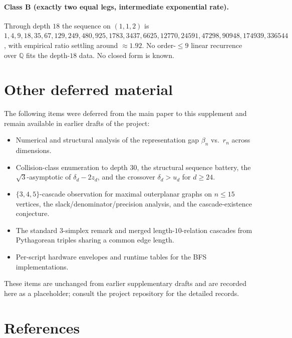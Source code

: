 \documentclass[11pt,a4paper]{article}
\theoremstyle{remark}
\theoremstyle{plain}
\begin{document}
\paragraph{Class B (exactly two equal legs, intermediate exponential rate).}
Through depth $18$ the sequence on $(1, 1, 2)$ is
$1, 4, 9, 18, 35, 67, 129, 249, 480, 925, 1783, 3437, 6625, 12770,
24591, 47298, 90948, 174939, 336544$, with empirical ratio settling
around $\approx 1.92$.  No order-$\le 9$ linear recurrence over
$\mathbb{Q}$ fits the depth-$18$ data.  No closed form is known.

\section{Other deferred material}
\label{sec:deferred}

The following items were deferred from the main paper to this
supplement and remain available in earlier drafts of the project:
\begin{itemize}[leftmargin=*,itemsep=0.15em]
\item Numerical and structural analysis of the representation gap
$\beta_n$ vs.\ $r_n$ across dimensions.
\item Collision-class enumeration to depth $30$, the structural
sequence battery, the $\sqrt{3}$-asymptotic of $\delta_d - 2 z_d$, and
the crossover $\delta_d > u_d$ for $d \ge 24$.
\item $\{3, 4, 5\}$-cascade observation for maximal outerplanar graphs
on $n \le 15$ vertices, the slack/denominator/precision analysis, and
the cascade-existence conjecture.
\item The standard 3-simplex remark and merged length-$10$-relation
cascades from Pythagorean triples sharing a common edge length.
\item Per-script hardware envelopes and runtime tables for the BFS
implementations.
\end{itemize}

These items are unchanged from earlier supplementary drafts and are
recorded here as a placeholder; consult the project repository for the
detailed records.

\section*{References}
\end{document}
